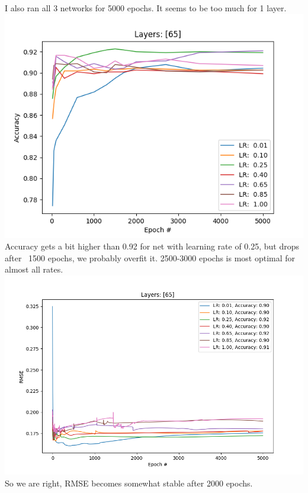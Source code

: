 \documentclass[12pt, letterpaper]{article}
\begin{document}
\begin{enumerate}[label=\Roman*.]
	   I also ran all 3 networks for 5000 epochs. It seems to be too much for 1 layer.
	   {\center \includegraphics[scale=0.7]{../images/accuracy2_0.png} \\}
	   Accuracy gets a bit higher than 0.92 for net with learning rate of 0.25, but drops after ~1500 epochs, we probably overfit it. 2500-3000 epochs is most optimal for almost all rates.
	    {\center \includegraphics[scale=0.7]{../images/rmse3_0.png} \\}
	    So we are right, RMSE becomes somewhat stable after 2000 epochs.\\
	    

\end{enumerate}
\end{document}
